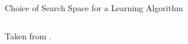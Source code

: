 \begin{frame}{Choice of Search Space for a Learning Algorithm}
\begin{columns}
\begin{column}{0.4\textwidth}
\begin{center}
{        }

        {\tiny Taken from .}
      \end{center}
    \end{column}
  \end{columns}
\end{frame}

